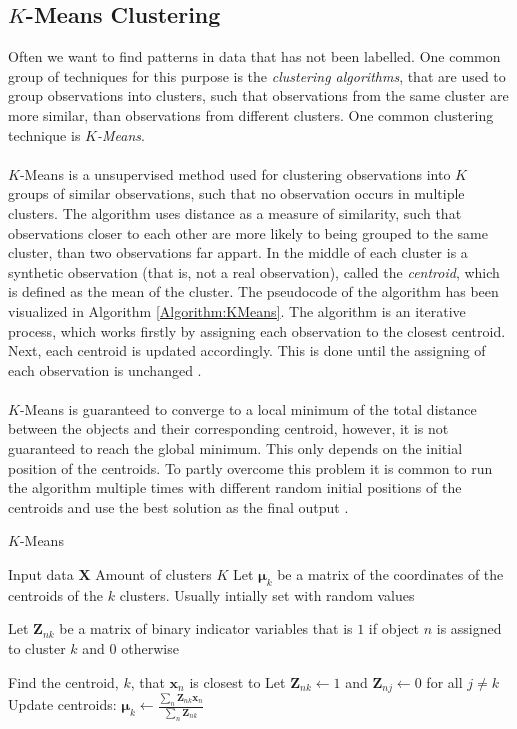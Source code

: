 \documentclass[./main.tex]{subfiles}
\begin{document}
\subsection{$K$-Means Clustering}

Often we want to find patterns in data that has not been labelled. One common group of techniques for this purpose is the \textit{clustering algorithms}, that are used to group observations into clusters, such that observations from the same cluster are more similar, than observations from different clusters. One common clustering technique is $K$\textit{-Means}.
\\
\\
$K$-Means is a unsupervised method used for clustering observations into $K$ groups of similar observations, such that no observation occurs in multiple clusters. The algorithm uses distance as a measure of similarity, such that observations closer to each other are more likely to being grouped to the same cluster, than two observations far appart. In the middle of each cluster is a synthetic observation (that is, not a real observation), called the \textit{centroid}, which is defined as the mean of the cluster. The pseudocode of the algorithm has been visualized in Algorithm \ref{Algorithm:KMeans}. The algorithm is an iterative process, which works firstly by assigning each observation to the closest centroid. Next, each centroid is updated accordingly. This is done until the assigning of each observation is unchanged \cite{MAD_book}.
\\
\\
$K$-Means is guaranteed to converge to a local minimum of the total distance between the objects and their corresponding centroid, however, it is not guaranteed to reach the global minimum. This only depends on the initial position of the centroids. To partly overcome this problem it is common to run the algorithm multiple times with different random initial positions of the centroids and use the best solution as the final output \cite{MAD_book}.

\begin{algorithm}[h]
    \caption{$K$-Means \cite{MAD_book}}
    \begin{algorithmic}[1]
        \Require Input data $\bm{X}$
        \Require Amount of clusters $K$
        \State Let $\bm{\mu}_k$ be a matrix of the coordinates of the centroids of the $k$ clusters. Usually intially set with random values
        \State \begin{varwidth}[t]{\linewidth}
            Let $\bm{Z}_{nk}$ be a matrix of binary indicator variables that is $1$ if object $n$ is assigned to cluster $k$ and $0$ otherwise
        \end{varwidth}
                \State Find the centroid, $k$, that $\bm{x}_n$ is closest to
                \State Let $\bm{Z}_{nk} \gets 1$ and $\bm{Z}_{nj} \gets 0$ for all $j \neq k$
            \EndFor
            \State Update centroids: $\bm{\mu}_k \gets \frac{\sum_n\bm{Z}_{nk} \bm{x}_n}{\sum_n \bm{Z}_{nk}}$
        \EndWhile
    \end{algorithmic}
    \label{Algorithm:KMeans}
\end{algorithm}
\end{document}
